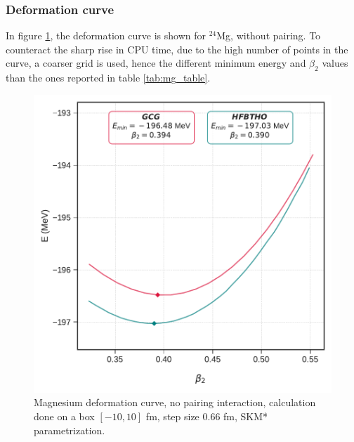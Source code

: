 \subsubsection{Deformation curve}
In figure \ref{fig:mg_no_pair_deformation}, the deformation curve is shown for $^{24}$Mg, without pairing. To counteract the sharp rise in CPU time, due to the high number of points in the curve, a coarser grid is used, hence the different minimum energy and $\beta_2$ values than the ones reported in table \ref{tab:mg_table}.
\begin{figure}[h]
  \centering
  \includegraphics[width=0.8\linewidth]{Images/mg_nopair_curve.pdf}
  \caption{Magnesium deformation curve, no pairing interaction, calculation done on a box $[-10, 10]$ fm, step size 0.66 fm, SKM* parametrization.}
  \label{fig:mg_no_pair_deformation}
\end{figure}